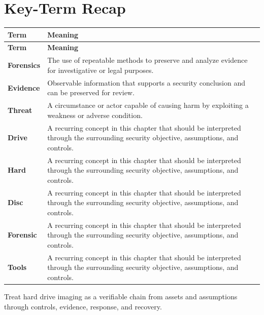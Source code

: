 \documentclass[11pt]{article}
\begin{document}
\section*{Key-Term Recap}
\begin{longtable}{>{\RaggedRight\arraybackslash}p{}>{\RaggedRight\arraybackslash}p{}}
\toprule\rowcolor{Navy}\color{white}\textbf{Term} & \color{white}\textbf{Meaning}\\\midrule
\endfirsthead
\toprule\rowcolor{Navy}\color{white}\textbf{Term} & \color{white}\textbf{Meaning}\\\midrule
\endhead
\textbf{Forensics} & The use of repeatable methods to preserve and analyze evidence for investigative or legal purposes. \\\midrule
\textbf{Evidence} & Observable information that supports a security conclusion and can be preserved for review. \\\midrule
\textbf{Threat} & A circumstance or actor capable of causing harm by exploiting a weakness or adverse condition. \\\midrule
\textbf{Drive} & A recurring concept in this chapter that should be interpreted through the surrounding security objective, assumptions, and controls. \\\midrule
\textbf{Hard} & A recurring concept in this chapter that should be interpreted through the surrounding security objective, assumptions, and controls. \\\midrule
\textbf{Disc} & A recurring concept in this chapter that should be interpreted through the surrounding security objective, assumptions, and controls. \\\midrule
\textbf{Forensic} & A recurring concept in this chapter that should be interpreted through the surrounding security objective, assumptions, and controls. \\\midrule
\textbf{Tools} & A recurring concept in this chapter that should be interpreted through the surrounding security objective, assumptions, and controls. \\\midrule
\bottomrule
\end{longtable}
\begin{takeawaybox}
Treat hard drive imaging as a verifiable chain from assets and assumptions through controls, evidence, response, and recovery.
\end{takeawaybox}
\end{document}
